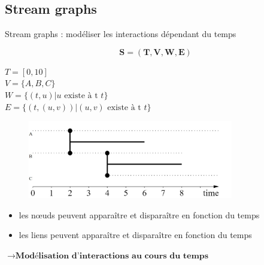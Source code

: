 \documentclass[15pt]{beamer}
\def \Stgs {Stream graphs}
\begin{document}
\subsection{Stream graphs}

\begin{frame}{\Stgs{} : modéliser les interactions dépendant du temps}


\medskip

\begin{minipage}{0.43\textwidth}
\[
	\mathbf{S=(T,V,W,E)}
\]
\begin{footnotesize}
$T=[0,10]$\\
$V=\{A,B,C\}$\\
$W = \{(t,u) | u \text{ existe à t } t\}$\\
$E = \{(t,(u,v)) | (u,v) \text{ existe à t } t\}$
\end{footnotesize}
\end{minipage}
\begin{minipage}[r]{0.55\textwidth}
\begin{figure}
    \flushright
    \includegraphics[width=0.8\textwidth]{img/exStreamGraph.JPG}
    \label{fig:exstream}
\end{figure}
\end{minipage}
\medskip

\begin{itemize}
    \item les n\oe{}uds peuvent apparaître et disparaître en fonction du temps
    \item les liens peuvent apparaître et disparaître en fonction du temps
\end{itemize}
\smallskip
\centering
$\rightarrow \textbf{Modélisation d'interactions au cours du temps}$





\end{frame}
\end{document}
